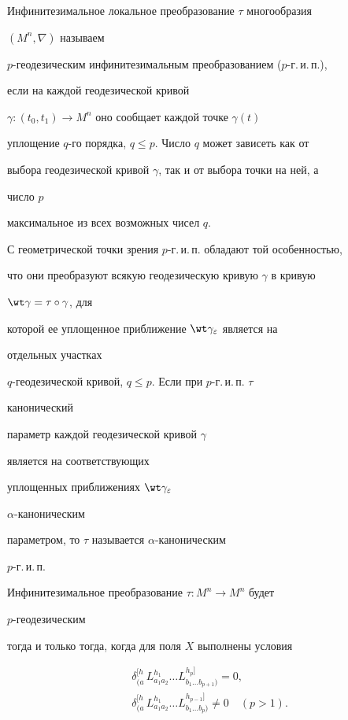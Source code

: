 \begin{defn}


Инфинитезимальное локальное преобразование $\tau$ многообразия


$(M^n,\nabla)$ называем


$p$-геодезическим инфинитезимальным преобразованием ($p$-г.\,и.\,п.),


если на каждой геодезической кривой


$\gamma:(t_0,t_1)\to M^n$ оно сообщает каждой точке $\gamma(t)$


уплощение $q$-го порядка, $q\le p$. Число $q$ может зависеть как от


выбора геодезической кривой $\gamma$, так и от выбора точки на ней, а


число $p$


максимальное из всех возможных чисел $q$.


\end{defn}





С геометрической точки зрения $p$-г.\,и.\,п. обладают той особенностью,


что они преобразуют всякую геодезическую кривую $\gamma$ в кривую


$\wt\gamma=\tau\circ\gamma$, для


которой ее уплощенное приближение $\wt\gamma_\varepsilon$ является на


отдельных участках


$q$-геодезической кривой, $q\le p$. Если при $p$-г.\,и.\,п. $\tau$


канонический


параметр каждой геодезической кривой $\gamma$


является на соответствующих


уплощенных приближениях $\wt\gamma_\varepsilon$\;


$\alpha$-каноническим


параметром, то $\tau$ называется $\alpha$-каноническим


$p$-г.\,и.\,п.





Инфинитезимальное преобразование $\tau:M^n\to M^n$ будет


$p$-геодезическим


тогда и только тогда, когда для поля $X$ выполнены условия


\begin{align}


& \delta^{[h}_{(a}\,L^{h_1}_{a_1a_2}\dots


L^{h_p]}_{b_1\dots b_{p+1})}=0, \\


%


& \delta^{[h}_{(a}\,L^{h_1}_{a_1a_2}\dots


L^{h_{p-1}]}_{b_1\dots b_p)}\ne 0\quad (p>1).


\end{align}


